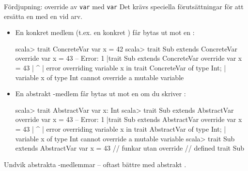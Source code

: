\begin{Slide}{Fördjupning: override av \texttt{var} med \texttt{var}}\SlideFontTiny
Det krävs speciella förutsättningar för att ersätta en  med en  vid arv.
\begin{itemize}
\item En konkret medlem (t.ex. en konkret ) får  bytas ut mot en :
\begin{REPLsmall}
scala> trait ConcreteVar { var x = 42 }
scala> trait Sub extends ConcreteVar { override var x = 43 }
-- Error:
1 |trait Sub extends ConcreteVar { override var x = 43 }
  |                                             ^
  |             error overriding variable x in trait ConcreteVar of type Int;
  |               variable x of type Int cannot override a mutable variable
\end{REPLsmall}
\item En abstrakt -medlem får bytas ut mot en  om du  skriver :
\begin{REPLsmall}
scala> trait AbstractVar { var x: Int }
scala> trait Sub extends AbstractVar { override var x = 43 }
-- Error:
1 |trait Sub extends AbstractVar { override var x = 43 }
  |                                             ^
  |             error overriding variable x in trait AbstractVar of type Int;
  |               variable x of type Int cannot override a mutable variable
scala> trait Sub extends AbstractVar { var x = 43 }   // funkar utan override
// defined trait Sub
\end{REPLsmall}
\end{itemize}
Undvik abstrakta -medlemmar -- oftast bättre med abstrakt .
\end{Slide}

